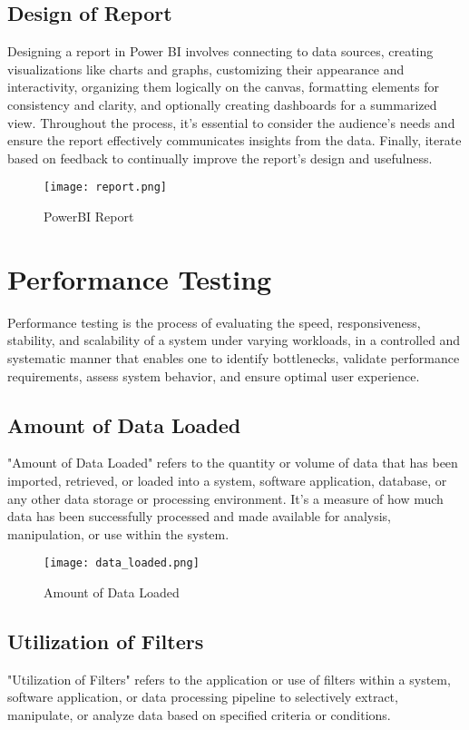 \documentclass{article}
\begin{document}
\subsection{Design of Report}
Designing a report in Power BI involves connecting to data sources, creating visualizations like charts and graphs, customizing their appearance and interactivity, organizing them logically on the canvas, formatting elements for consistency and clarity, and optionally creating dashboards for a summarized view. Throughout the process, it's essential to consider the audience's needs and ensure the report effectively communicates insights from the data. Finally, iterate based on feedback to continually improve the report's design and usefulness.
\begin{figure}[H]
    \centering
    \texttt{[image: report.png]}
    \caption{PowerBI Report}
    \label{fig:report}
  \end{figure}

\section{Performance Testing}
Performance testing is the process of evaluating the speed, responsiveness, stability, and scalability of a system under varying workloads, in a controlled and systematic manner that enables one to identify bottlenecks, validate performance requirements, assess system behavior, and ensure optimal user experience.

\subsection{Amount of Data Loaded}
"Amount of Data Loaded" refers to the quantity or volume of data that has been imported, retrieved, or loaded into a system, software application, database, or any other data storage or processing environment. It's a measure of how much data has been successfully processed and made available for analysis, manipulation, or use within the system.
\begin{figure}[H]
    \centering
    \texttt{[image: data\_loaded.png]}
    \caption{Amount of Data Loaded}
    \label{fig:data_loaded}
  \end{figure}

\subsection{Utilization of Filters}
"Utilization of Filters" refers to the application or use of filters within a system, software application, or data processing pipeline to selectively extract, manipulate, or analyze data based on specified criteria or conditions.
\end{document}
